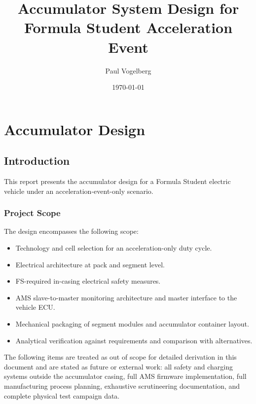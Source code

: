 \documentclass[11pt, a4paper]{report}
\title{Accumulator System Design for Formula Student Acceleration Event}
\author{Paul Vogelberg}
\date{\today}
\numberwithin{equation}{section}
\begin{document}

\maketitle

\newpage

\setcounter{page}{1}

\tableofcontents
\newpage

\chapter{Accumulator Design}

\section{Introduction}
This report presents the accumulator design for a Formula Student electric vehicle under an acceleration-event-only scenario.


\subsection{Project Scope}
The design encompasses the following scope:
\begin{itemize}
    \item Technology and cell selection for an acceleration-only duty cycle.
    \item Electrical architecture at pack and segment level.
    \item FS-required in-casing electrical safety measures.
    \item AMS slave-to-master monitoring architecture and master interface to the vehicle ECU.
    \item Mechanical packaging of segment modules and accumulator container layout.
    \item Analytical verification against requirements and comparison with alternatives.
\end{itemize}

The following items are treated as out of scope for detailed derivation in this document and are stated as future or external work: all safety and charging systems outside the accumulator casing, full AMS firmware implementation, full manufacturing process planning, exhaustive scrutineering documentation, and complete physical test campaign data.
\end{document}
